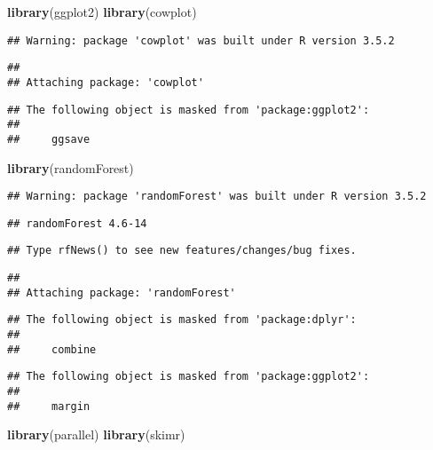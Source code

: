 \documentclass[]{article}
\newenvironment{Shaded}{\begin{snugshade}}{\end{snugshade}}
\newcommand{\KeywordTok}[1]{\textcolor[rgb]{0.13,0.29,0.53}{\textbf{#1}}}
\newcommand{\NormalTok}[1]{#1}
\begin{document}
\begin{Shaded}
\begin{Highlighting}[]
\KeywordTok{library}\NormalTok{(ggplot2)}
\KeywordTok{library}\NormalTok{(cowplot)}
\end{Highlighting}
\end{Shaded}

\begin{verbatim}
## Warning: package 'cowplot' was built under R version 3.5.2
\end{verbatim}

\begin{verbatim}
## 
## Attaching package: 'cowplot'
\end{verbatim}

\begin{verbatim}
## The following object is masked from 'package:ggplot2':
## 
##     ggsave
\end{verbatim}

\begin{Shaded}
\begin{Highlighting}[]
\KeywordTok{library}\NormalTok{(randomForest)}
\end{Highlighting}
\end{Shaded}

\begin{verbatim}
## Warning: package 'randomForest' was built under R version 3.5.2
\end{verbatim}

\begin{verbatim}
## randomForest 4.6-14
\end{verbatim}

\begin{verbatim}
## Type rfNews() to see new features/changes/bug fixes.
\end{verbatim}

\begin{verbatim}
## 
## Attaching package: 'randomForest'
\end{verbatim}

\begin{verbatim}
## The following object is masked from 'package:dplyr':
## 
##     combine
\end{verbatim}

\begin{verbatim}
## The following object is masked from 'package:ggplot2':
## 
##     margin
\end{verbatim}

\begin{Shaded}
\begin{Highlighting}[]
\KeywordTok{library}\NormalTok{(parallel)}
\KeywordTok{library}\NormalTok{(skimr)}
\end{Highlighting}
\end{Shaded}
\end{document}
